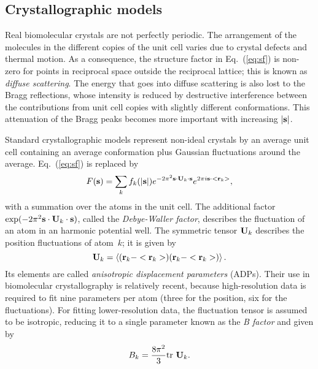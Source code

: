 \documentclass[12pt]{article}
\newcommand{\vect}[1]{{\bf #1}}
\newcommand{\mat}[1]{{\bf #1}}
\newcommand{\vr}{\vect{r}}
\newcommand{\vs}{\vect{s}}
\newcommand{\mU}{\mat{U}}
\begin{document}
\begin{sloppy}
\subsection{Crystallographic models}

Real biomolecular crystals are not perfectly periodic. The arrangement
of the molecules in the different copies of the unit cell varies due
to crystal defects and thermal motion. As a consequence, the structure
factor in Eq.~(\ref{eq:sf}) is non-zero for points in reciprocal space
outside the reciprocal lattice; this is known as \textit{diffuse
scattering}. The energy that goes into diffuse scattering is also
lost to the Bragg reflections, whose intensity is reduced by
destructive interference between the contributions from unit cell
copies with slightly different conformations. This attenuation of the
Bragg peaks becomes more important with increasing $|\vs|$.

Standard crystallographic models represent non-ideal crystals by an
average unit cell containing an average conformation plus Gaussian
fluctuations around the average. Eq.~(\ref{eq:sf}) is replaced by
\begin{equation}
\label{eq:model_sf}
F(\vs) = \sum_k f_k(|\vs|) e^{-2\pi^2 \vs\cdot\mU_k\cdot\vs} e^{2\pi i\vs\cdot<\vr_k>},
\end{equation}
with a summation over the atoms in the unit cell.
The additional factor $\exp(-2\pi^2 \vs\cdot\mU_k\cdot\vs)$,
called the \textit{Debye-Waller factor}, describes the fluctuation
of an atom in an harmonic potential well. The symmetric tensor $\mU_k$
describes the position fluctuations of atom~$k$; it is given by
\begin{equation}
\mU_k = \left<  (\vr_k-<\vr_k>) (\vr_k-<\vr_k>) \right>.
\end{equation}
Its elements are called \textit{anisotropic displacement parameters}
(ADPs). Their use in biomolecular crystallography is relatively
recent, because high-resolution data is required to fit nine
parameters per atom (three for the position, six for the
fluctuations). For fitting lower-resolution data, the fluctuation
tensor is assumed to be isotropic, reducing it to a single parameter
known as the \textit{B factor} and given by
\begin{equation}
B_k = \frac{8\pi^2}{3} \mbox{tr } \mU_k.
\end{equation}


\end{sloppy}
\end{document}
